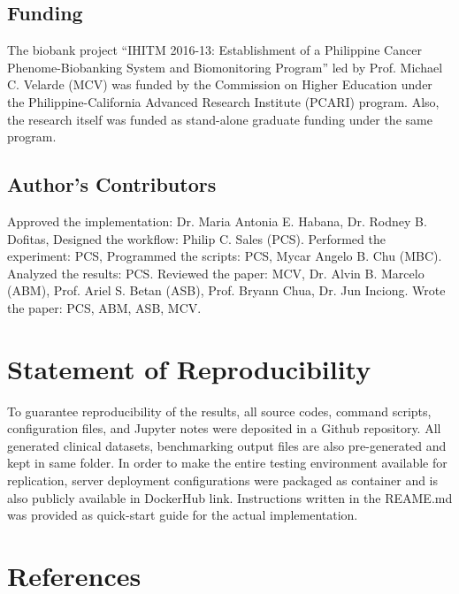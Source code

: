 \documentclass[5p]{elsarticle}
\begin{document}
\subsection*{Funding} The biobank project “IHITM 2016-13: Establishment of a Philippine Cancer 
Phenome-Biobanking System and Biomonitoring Program” led by Prof. Michael C. Velarde (MCV) was funded by the Commission on Higher Education under
the Philippine-California Advanced Research Institute (PCARI) program. Also, the research itself was funded as stand-alone graduate funding under the same program. 

\subsection*{Author's Contributors} 
Approved the implementation: Dr. Maria Antonia E. Habana, Dr. Rodney B. Dofitas, 
Designed the workflow: Philip C. Sales (PCS). Performed the experiment: PCS, 
Programmed the scripts: PCS, Mycar Angelo B. Chu (MBC). Analyzed the results: PCS. 
Reviewed the paper: MCV, Dr. Alvin B. Marcelo (ABM), Prof. Ariel S. Betan (ASB), Prof. Bryann Chua, Dr. Jun Inciong. 
Wrote the paper: PCS, ABM, ASB, MCV.

\section*{Statement of Reproducibility}
To guarantee reproducibility of the results, all source codes, command scripts, configuration files, and Jupyter notes were deposited in a Github repository. 
All generated clinical datasets, benchmarking output files are also pre-generated and kept in same folder. 
In order to make the entire testing environment available for replication, server deployment configurations were packaged as container and is also publicly available in DockerHub link. 
Instructions written in the REAME.md was provided as quick-start guide for the actual implementation.

\section*{References}


\end{document}

